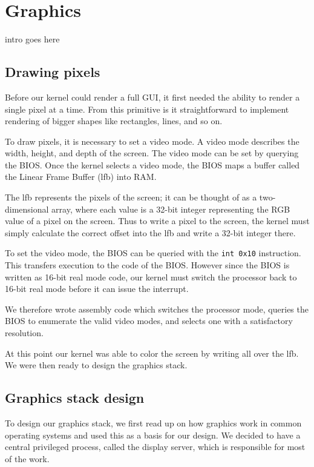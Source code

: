 \documentclass{report}
\begin{document}


\chapter{Graphics}
\label{sec:graphics}


intro goes here

\section{Drawing pixels}
Before our kernel could render a full GUI, it first needed the ability
to render a single pixel at a time. From this primitive is it straightforward
to implement rendering of bigger shapes like rectangles, lines, and so on.

To draw pixels, it is necessary to set a video mode. A video mode describes
the width, height, and depth of the screen. The video mode can be set by
querying the BIOS. Once the kernel selects a video mode, the BIOS maps a
buffer called the Linear Frame Buffer (\gls{lfb}) into RAM. 

The \gls{lfb} represents the pixels of the screen; it can be thought of as a
two-dimensional array, where each value is a 32-bit integer representing the
RGB value of a pixel on the screen. Thus to write a pixel to the screen, the
kernel must simply calculate the correct offset into the \gls{lfb} and write a
32-bit integer there.

To set the video mode, the BIOS can be queried with the \texttt{int 0x10}
instruction. This transfers execution to the code of the BIOS. However since
the BIOS is written as 16-bit real mode code, our kernel must switch the
processor back to 16-bit real mode before it can issue the interrupt.

We therefore wrote assembly code which switches the processor mode,
queries the BIOS to enumerate the valid video modes, and selects one with a
satisfactory resolution.

At this point our kernel was able to color the screen by writing all over the
\gls{lfb}. We were then ready to design the graphics stack.


\section{Graphics stack design}
To design our graphics stack, we first read up on how graphics work in common
operating systems and used this as a basis for our design. We decided to
have a central privileged process, called the display server, which is
responsible for most of the work.
\end{document}
